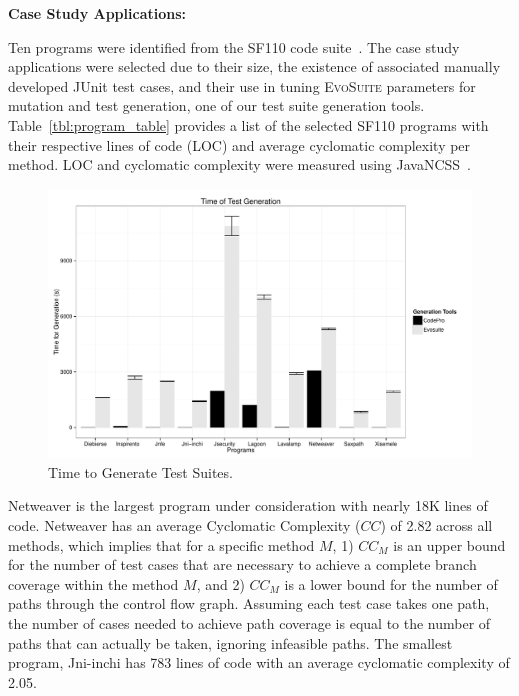 \noindent \textbf{Case Study Applications:}  

Ten programs were identified from the SF110 code suite~\cite{fraser:2012}.  The case study applications were selected due to their size, the existence of associated manually developed JUnit test cases, and their use in tuning \textsc{EvoSuite} parameters for mutation and test generation, one of our test suite generation tools.  Table~\ref{tbl:program_table} provides a list of the selected SF110 programs with their respective lines of code (LOC) and average cyclomatic complexity per method.  LOC and cyclomatic complexity were measured using JavaNCSS~\cite{leejavancss}.  

\begin{figure}[!t]
\centering
  \includegraphics[scale=0.5]{RGraphs/TimeOfGeneration.pdf}
    \caption{Time to Generate Test Suites.}
  \label{fig:TimeGen}
\end{figure}

Netweaver is the largest program under consideration with nearly 18K lines of code.  Netweaver has an average Cyclomatic Complexity ($CC$) of 2.82 across all methods, which implies that for a specific method $M$, 1) $CC_M$ is an upper bound for the number of test cases that are necessary to achieve a complete branch coverage within the method $M$, and 2) $CC_M$ is a lower bound for the number of paths through the control flow graph. Assuming each test case takes one path, the number of cases needed to achieve path coverage is equal to the number of paths that can actually be taken, ignoring infeasible paths.  The smallest program, Jni-inchi has 783 lines of code with an average cyclomatic complexity of 2.05.  

